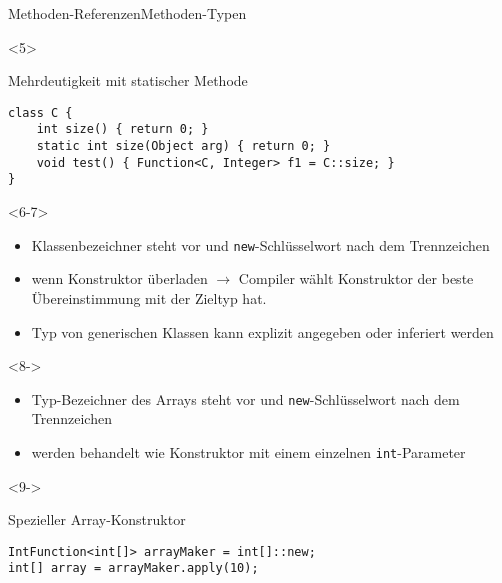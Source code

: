 \begin{frame}[fragile]{Methoden-Referenzen}{Methoden-Typen}
\begin{onlyenv}
        \begin{onlyenv}<5>
            \begin{center}
                \begin{minipage}[b]{0.75\textwidth}
                    \begin{block}{Mehrdeutigkeit mit statischer Methode \citep{Gosling14}}
                        \begin{lstlisting}
class C {
    int size() { return 0; }
    static int size(Object arg) { return 0; }
    void test() { Function<C, Integer> f1 = C::size; }
}
                        \end{lstlisting}
                    \end{block}
                \end{minipage}
            \end{center}
        \end{onlyenv}
    \end{onlyenv}
    \begin{onlyenv}<6-7>
        \begin{itemize}
            \item<6-> Klassenbezeichner steht vor und \texttt{new}-Schlüsselwort nach dem Trennzeichen
            \item<7-> wenn Konstruktor überladen $\rightarrow$ Compiler wählt Konstruktor der beste 
            Übereinstimmung mit der Zieltyp hat.
            \item<7-> Typ von generischen Klassen kann explizit angegeben oder inferiert werden
        \end{itemize}
    \end{onlyenv}
    \begin{onlyenv}<8->
        \begin{itemize}
            \item<8-> Typ-Bezeichner des Arrays steht vor und \texttt{new}-Schlüsselwort nach dem Trennzeichen
            \item<9-> werden behandelt wie Konstruktor mit einem einzelnen \texttt{int}-Parameter 
        \end{itemize}
        \begin{onlyenv}<9->
            \begin{center}
                \begin{minipage}[b]{0.75\textwidth}
                    \begin{block}{Spezieller Array-Konstruktor \citep{goetz13}}
                        \begin{lstlisting}
IntFunction<int[]> arrayMaker = int[]::new;
int[] array = arrayMaker.apply(10);
                        \end{lstlisting}
                    \end{block}
                \end{minipage}
            \end{center}
        \end{onlyenv}
    \end{onlyenv}
\end{frame}